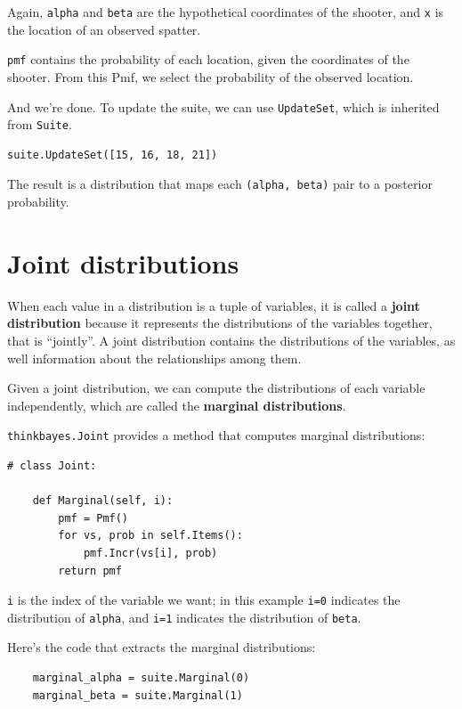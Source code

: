 \documentclass[12pt]{book}
\begin{document}
Again, {\tt alpha} and {\tt beta} are the hypothetical coordinates of
the shooter, and {\tt x} is the location of an observed spatter.

{\tt pmf} contains the probability of each location, given the
coordinates of the shooter.  From this Pmf, we select the probability
of the observed location.

And we're done.  To update the suite, we can use {\tt UpdateSet},
which is inherited from {\tt Suite}.

\begin{verbatim}
suite.UpdateSet([15, 16, 18, 21])
\end{verbatim}

The result is a distribution that maps each {\tt (alpha, beta)} pair
to a posterior probability.


\section{Joint distributions}

When each value in a distribution is a tuple of variables, it is
called a {\bf joint distribution} because it represents the
distributions of the variables together, that is ``jointly''.
A joint distribution contains the distributions of the variables,
as well information about the relationships among them.

Given a joint distribution, we can compute the distributions
of each variable independently, which are called the {\bf marginal
distributions}.

{\tt thinkbayes.Joint} provides a method that computes marginal
distributions:

\begin{verbatim}
# class Joint:

    def Marginal(self, i):
        pmf = Pmf()
        for vs, prob in self.Items():
            pmf.Incr(vs[i], prob)
        return pmf
\end{verbatim}

{\tt i} is the index of the variable we want; in this example
{\tt i=0} indicates the distribution of {\tt alpha}, and
{\tt i=1} indicates the distribution of {\tt beta}.

Here's the code that extracts the marginal distributions:

\begin{verbatim}
    marginal_alpha = suite.Marginal(0)
    marginal_beta = suite.Marginal(1)
\end{verbatim}
\end{document}
